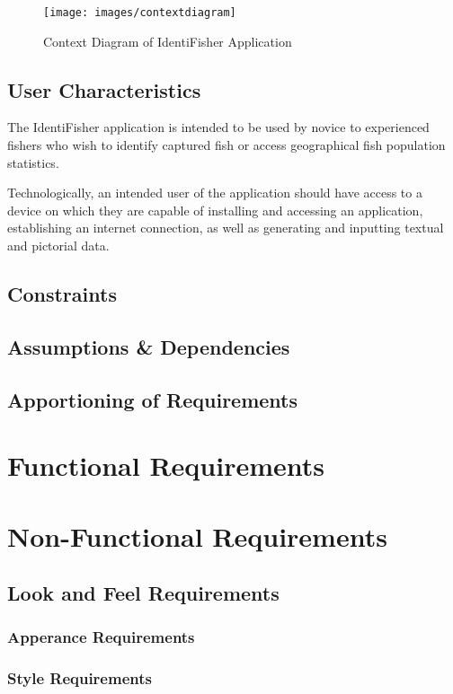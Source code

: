 \documentclass{article}
\begin{document}
\begin{figure}[H]
	\texttt{[image: images/contextdiagram]}
	\caption{Context Diagram of IdentiFisher Application}
\end{figure}


\subsection{User Characteristics}
The IdentiFisher application is intended to be used by novice to experienced fishers who wish to identify captured fish or access geographical fish population statistics. 

Technologically, an intended user of the application should have access to a device on which they are capable of installing and accessing an application, establishing an internet connection, as well as generating and inputting textual and pictorial data. 

\subsection{Constraints}

\subsection{Assumptions \& Dependencies}

\subsection{Apportioning of Requirements}

\section{Functional Requirements}

\section{Non-Functional Requirements}

\subsection{Look and Feel Requirements}
\subsubsection{Apperance Requirements}
\subsubsection{Style Requirements}
\end{document}
